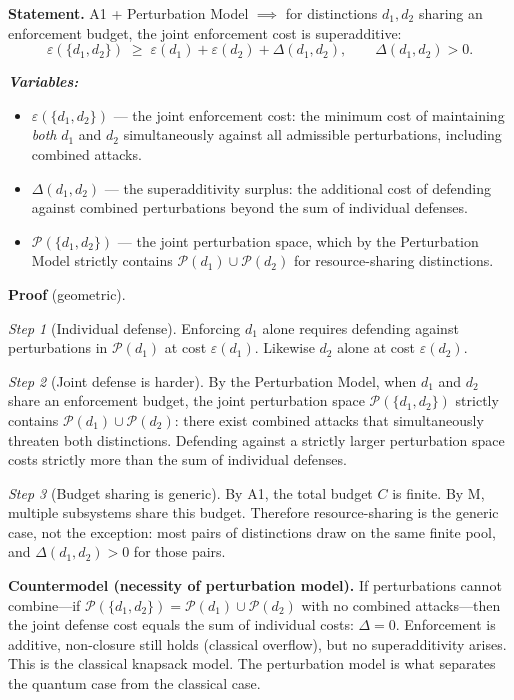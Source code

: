 \documentclass[11pt]{article}
\newenvironment{varlist}{\begin{itemize}[nosep,leftmargin=2em]}{\end{itemize}}
\begin{document}
\begin{tcolorbox}[apfbox, title={$L_{\Delta}$ (Competition): Superadditivity from Shared Budgets}]
\textbf{Statement.}  A1 + Perturbation Model $\implies$ for distinctions $d_1, d_2$ sharing an enforcement budget, the joint enforcement cost is superadditive:
\begin{equation}
\varepsilon(\{d_1, d_2\}) \;\ge\; \varepsilon(d_1) + \varepsilon(d_2) + \Delta(d_1, d_2), \qquad \Delta(d_1, d_2) > 0.
\end{equation}

\smallskip\noindent\textbf{\textit{Variables:}}
\begin{varlist}
\item $\varepsilon(\{d_1, d_2\})$ --- the joint enforcement cost: the minimum cost of maintaining \emph{both} $d_1$ and $d_2$ simultaneously against all admissible perturbations, including combined attacks.
\item $\Delta(d_1, d_2)$ --- the superadditivity surplus: the additional cost of defending against combined perturbations beyond the sum of individual defenses.
\item $\mathcal{P}(\{d_1, d_2\})$ --- the joint perturbation space, which by the Perturbation Model strictly contains $\mathcal{P}(d_1) \cup \mathcal{P}(d_2)$ for resource-sharing distinctions.
\end{varlist}

\smallskip\noindent\textbf{Proof} (geometric).

\textit{Step 1} (Individual defense).  Enforcing $d_1$ alone requires defending against perturbations in $\mathcal{P}(d_1)$ at cost $\varepsilon(d_1)$.  Likewise $d_2$ alone at cost $\varepsilon(d_2)$.

\textit{Step 2} (Joint defense is harder).  By the Perturbation Model, when $d_1$ and $d_2$ share an enforcement budget, the joint perturbation space $\mathcal{P}(\{d_1, d_2\})$ strictly contains $\mathcal{P}(d_1) \cup \mathcal{P}(d_2)$: there exist combined attacks that simultaneously threaten both distinctions.  Defending against a strictly larger perturbation space costs strictly more than the sum of individual defenses.

\textit{Step 3} (Budget sharing is generic).  By A1, the total budget $C$ is finite.  By M, multiple subsystems share this budget.  Therefore resource-sharing is the generic case, not the exception: most pairs of distinctions draw on the same finite pool, and $\Delta(d_1, d_2) > 0$ for those pairs.

\smallskip\noindent\textbf{Countermodel (necessity of perturbation model).}  If perturbations cannot combine---if $\mathcal{P}(\{d_1, d_2\}) = \mathcal{P}(d_1) \cup \mathcal{P}(d_2)$ with no combined attacks---then the joint defense cost equals the sum of individual costs: $\Delta = 0$.  Enforcement is additive, non-closure still holds (classical overflow), but no superadditivity arises.  This is the classical knapsack model.  The perturbation model is what separates the quantum case from the classical case.


\end{tcolorbox}
\end{document}
